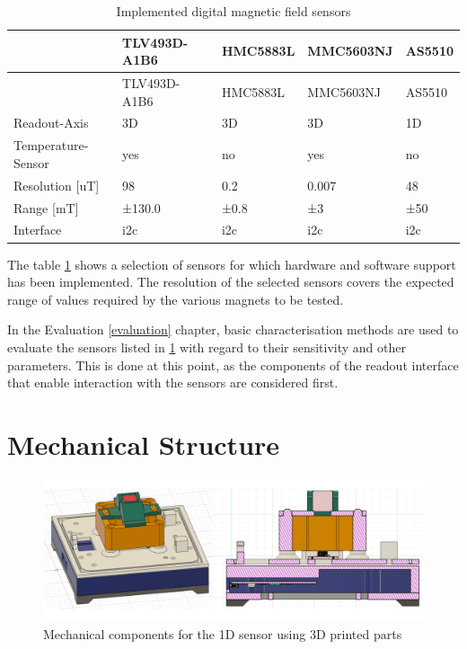 \begin{longtable}[]{@{}lllll@{}}
\caption{Implemented digital magnetic field sensors
\label{Implemented_digital_magnetic_field_sensors.csv}}\tabularnewline
\toprule
& TLV493D-A1B6 & HMC5883L & MMC5603NJ & AS5510\tabularnewline
\midrule
\endfirsthead
\toprule
& TLV493D-A1B6 & HMC5883L & MMC5603NJ & AS5510\tabularnewline
\midrule
\endhead
Readout-Axis & 3D & 3D & 3D & 1D\tabularnewline
Temperature-Sensor & yes & no & yes & no\tabularnewline
Resolution {[}uT{]} & 98 & 0.2 & 0.007 & 48\tabularnewline
Range {[}mT{]} & ±130.0 & ±0.8 & ±3 & ±50\tabularnewline
Interface & \gls{i2c} & \gls{i2c} & \gls{i2c} & \gls{i2c}\tabularnewline
\bottomrule
\end{longtable}

The table \ref{Implemented_digital_magnetic_field_sensors.csv} shows a
selection of sensors for which hardware and software support has been
implemented. The resolution of the selected sensors covers the expected
range of values required by the various magnets to be tested.

In the Evaluation \ref{evaluation} chapter, basic characterisation
methods are used to evaluate the sensors listed in
\ref{Implemented_digital_magnetic_field_sensors.csv} with regard to
their sensitivity and other parameters. This is done at this point, as
the components of the readout interface that enable interaction with the
sensors are considered first.

\hypertarget{mechanical-structure}{%
\section{Mechanical Structure}\label{mechanical-structure}}

\begin{figure}
\centering
\includegraphics{./generated_images/border_Mechanical_components_for_the_1D_sensor_using_3D_printed_parts.png}
\caption{Mechanical components for the 1D sensor using 3D printed parts
\label{Mechanical_components_for_the_1D_sensor_using_3D_printed_parts.png}}
\end{figure}

